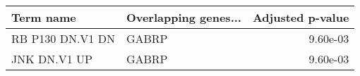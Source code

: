 \begin{tabular}{llr}
\toprule
       Term name & Overlapping genes... &  Adjusted p-value \\
\midrule
RB P130 DN.V1 DN &                GABRP &          9.60e-03 \\
    JNK DN.V1 UP &                GABRP &          9.60e-03 \\
\bottomrule
\end{tabular}
